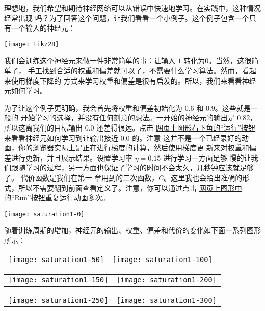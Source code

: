 理想地，我们希望和期待神经网络可以从错误中快速地学习。在实践中，这种情况经常出现
吗？为了回答这个问题，让我们看看一个小例子。这个例子包含一个只有一个输入的神经元：

\begin{center}
  \texttt{[image: tikz28]}
\end{center}

我们会训练这个神经元来做一件非常简单的事：让输入 $1$ 转化为$0$。当然，这很简单了，
手工找到合适的权重和偏差就可以了，不需要什么学习算法。然而，看起来使用梯度下降的
方式来学习权重和偏差是很有启发的。所以，我们来看看神经元如何学习。

为了让这个例子更明确，我会首先将权重和偏差初始化为 $0.6$ 和 $0.9$。这些就是一般的
开始学习的选择，并没有任何刻意的想法。一开始的神经元的输出是 $0.82$，所以这离我们的目标输出 $0.0$ 还差得很远。点击%
\href{http://neuralnetworksanddeeplearning.com/chap3.html#the_cross-entropy_cost_function}{
  网页上图形右下角的``运行''按钮}来看看神经元如何学习到让输出接近 $0.0$ 的。注意
这并不是一个已经录好的动画，你的浏览器实际上是正在进行梯度的计算，然后使用梯度更
新来对权重和偏差进行更新，并且展示结果。设置学习率 $\eta=0.15$ 进行学习一方面足够
慢的让我们跟随学习的过程，另一方面也保证了学习的时间不会太久，几秒钟应该就足够了。
代价函数是我们在第一 章用到的二次函数，$C$。这里我也会给出准确的形式，所以不需要翻到前面查看定义了。注意，你可以通过点击%
\href{http://neuralnetworksanddeeplearning.com/chap3.html#the_cross-entropy_cost_function}{
  网页上图形中的``Run''按钮}重复运行动画多次。
\begin{center}
  \texttt{[image: saturation1-0]}
\end{center}
随着训练周期的增加，神经元的输出、权重、偏差和代价的变化如下面一系列图形所示：
\begin{center}
  \begin{tabular}{ll}
    \texttt{[image: saturation1-50]} & \texttt{[image: saturation1-100]}\\
  \end{tabular}
  \begin{tabular}{ll}
    \texttt{[image: saturation1-150]} & \texttt{[image: saturation1-200]}\\
  \end{tabular}
  \begin{tabular}{ll}
    \texttt{[image: saturation1-250]} & \texttt{[image: saturation1-300]}
  \end{tabular}
\end{center}

